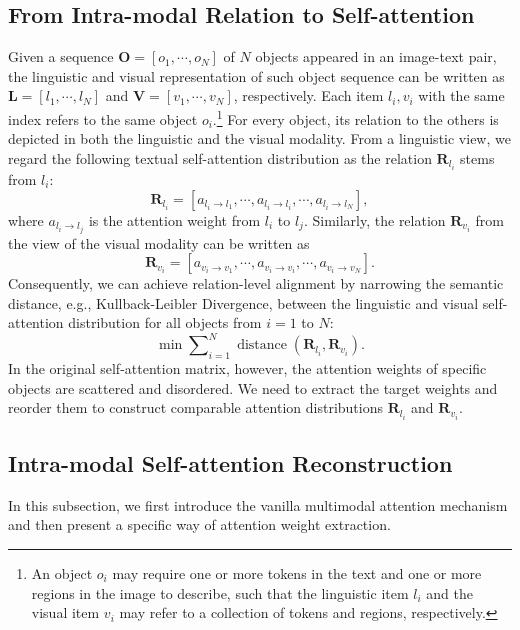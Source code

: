\documentclass[11pt,a4paper]{article}
\begin{document}
\subsection{From Intra-modal Relation to Self-attention}
\label{subsec:formal definition}
Given a sequence $\mathbf{O}=[o_1, \cdots, o_N]$ of $N$ objects appeared in an image-text pair, the linguistic and visual representation of such object sequence can be written as $\mathbf{L}=[l_1, \cdots, l_N]$ and $\mathbf{V}=[v_1, \cdots, v_N]$, respectively. 
Each item $l_i, v_i$ with the same index refers to the same object $o_i$.\footnote{An object $o_i$ may require one or more tokens in the text and one or more regions in the image to describe, such that the linguistic item $l_i$ and the visual item $v_i$ may refer to a collection of tokens and regions, respectively.} 
For every object, its relation   
to the others is depicted in both the linguistic and the visual modality. 
From a linguistic view, we regard the following textual self-attention distribution as the relation $\mathbf{R}_{l_i}$ stems from $l_i$: 
\begin{equation}
\mathbf{R}_{l_i}=[a_{l_i \rightarrow l_1}, \cdots, a_{l_i \rightarrow l_i}, \cdots, a_{l_i \rightarrow l_N}],
\end{equation}
where $a_{l_i \rightarrow l_j}$ is the attention weight from $l_i$ to $l_j$. 
Similarly, the relation $\mathbf{R}_{v_i}$ from the view of the visual modality can be written as
\begin{equation}
\mathbf{R}_{v_i}=[a_{v_i \rightarrow v_1}, \cdots, a_{v_i \rightarrow v_i}, \cdots, a_{v_i \rightarrow v_N}].
\end{equation}
Consequently, we can achieve relation-level alignment by narrowing the semantic distance, e.g., Kullback-Leibler Divergence, between the linguistic and visual self-attention distribution for all objects from $i=1$ to $N$: 
\begin{equation}
\min \sum\nolimits_{i=1}^{N} \operatorname{distance} \left( \mathbf{R}_{l_i}, \mathbf{R}_{v_i} \right).
\end{equation}
In the original self-attention matrix, however, the attention weights of specific objects are scattered and disordered. 
We need to extract the target weights and reorder them to construct comparable attention distributions $\mathbf{R}_{l_i}$ and $\mathbf{R}_{v_i}$. 

\subsection{Intra-modal Self-attention Reconstruction}
\label{subsec:Intra-modal Self-attention Reconstruction}
In this subsection, we first introduce the vanilla multimodal attention mechanism and then present a specific way of attention weight extraction. 
\end{document}
